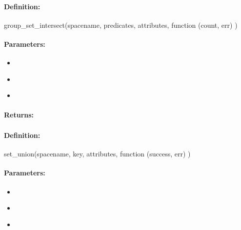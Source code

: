 \paragraph{Definition:}
\begin{javascriptcode}
group_set_intersect(spacename, predicates, attributes, function (count, err) {})
\end{javascriptcode}
\paragraph{Parameters:}
\begin{itemize}[noitemsep]
\item {}\\

\item {}\\

\item {}\\

\end{itemize}

\paragraph{Returns:}


\pagebreak
\subsubsection{}
\label{api:nodejs:set_union}


\paragraph{Definition:}
\begin{javascriptcode}
set_union(spacename, key, attributes, function (success, err) {})
\end{javascriptcode}
\paragraph{Parameters:}
\begin{itemize}[noitemsep]
\item {}\\

\item {}\\

\item {}\\

\end{itemize}

